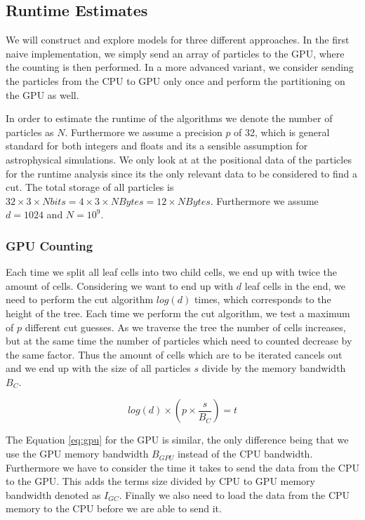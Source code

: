 \documentclass[]{article}
\begin{document}
\subsection{Runtime Estimates}

We will construct and explore models for three different approaches. In the first naive implementation, we simply send an array of particles to the GPU, where the counting is then performed. In a more advanced variant, we consider sending the particles from the CPU to GPU only once and perform the partitioning on the GPU as well.  

In order to estimate the runtime of the algorithms we denote the number of particles as $N$. Furthermore we assume a precision $p$ of 32, which is general standard for both integers and floats and its a sensible assumption for astrophysical simulations. We only look at at the positional data of the particles for the runtime analysis since its the only relevant data to be considered to find a cut. The total storage of all particles is $32 \times 3 \times N bits = 4 \times 3 \times N Bytes = 12 \times N Bytes$. Furthermore we assume $d = 1024$ and $N=10^9$.
 
\subsubsection{GPU Counting}

Each time we split all leaf cells into two child cells, we end up with twice the amount of cells. Considering we want to end up with $d$ leaf cells in the end, we need to perform the cut algorithm $log(d)$ times, which corresponds to the height of the tree. Each time we perform the cut algorithm, we test a maximum of $p$ different cut guesses. As we traverse the tree the number of cells increases, but at the same time the number of particles which need to counted decrease by the same factor. Thus the amount of cells which are to be iterated cancels out and we end up with the size of all particles $s$ divide by the memory bandwidth $B_C$.  
 
\begin{center}
	\begin{equation}
			log(d) \times \left ( p \times \frac{ s }{B_{C}} \right ) = t
			\label{eq:cpu}
	\end{equation}
\end{center}

\vspace{5mm}


The Equation \ref{eq:gpu} for the GPU is similar, the only difference being that we use the GPU memory bandwidth $B_{GPU}$ instead of the CPU bandwidth. Furthermore we have to consider the time it takes to send the data from the CPU to the GPU. This adds the terms size divided by CPU to GPU memory bandwidth denoted as $I_{GC}$. Finally we also need to load the data from the CPU memory to the CPU before we are able to send it. 
\end{document}
